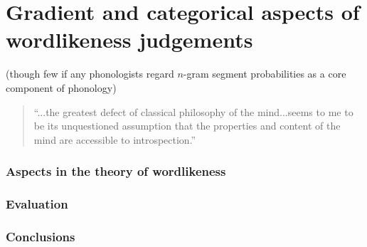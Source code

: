 \chapter{Gradient and categorical aspects of wordlikeness judgements}
\label{gradience}

(though few if any phonologists regard $n$-gram segment probabilities as a core component of phonology)

\begin{quotation}
``...the greatest defect of classical philosophy of the mind...seems to me to be its unquestioned assumption that the properties and content of the mind are accessible to introspection.'' \citep[][22]{Chomsky1968}
\end{quotation}

\subsection{Aspects in the theory of wordlikeness} 
\subsection{Evaluation}                            
\subsection{Conclusions}                           
